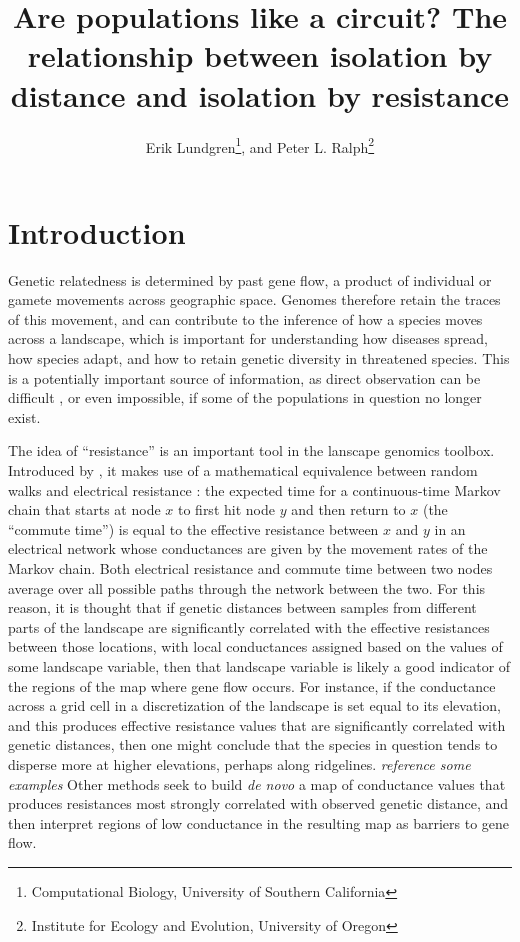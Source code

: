 \documentclass{article}
\newcommand{\plr}[1]{{\em \color{blue} #1}}
\begin{document}
\title{Are populations like a circuit? The relationship between isolation by distance and isolation by resistance}
\author{Erik Lundgren\footnote{Computational Biology, University of Southern California}, and
        Peter L. Ralph\footnote{Institute for Ecology and Evolution, University of Oregon}}
\maketitle

\begin{abstract}
\end{abstract}


\section*{Introduction}

Genetic relatedness is determined by past gene flow,
a product of individual or gamete movements across geographic space.
Genomes therefore retain the traces of this movement,
and can contribute to the inference of how a species moves across a landscape,
which is important for understanding how diseases spread, how species adapt,
and how to retain genetic diversity in threatened species.
This is a potentially important source of information,
as direct observation can be difficult \citep[especially of long-distance movement]{dispersal_estimation},
or even impossible, if some of the populations in question no longer exist.

The idea of ``resistance'' is an important tool in the lanscape genomics toolbox.
Introduced by \citet{mcrae},
it makes use of a mathematical equivalence between random walks and electrical resistance
\citep{resistance}:
the expected time for a continuous-time Markov chain that starts at node $x$
to first hit node $y$ and then return to $x$ (the ``commute time'')
is equal to the effective resistance between $x$ and $y$ in an electrical network
whose conductances are given by the movement rates of the Markov chain.
Both electrical resistance and commute time between two nodes
average over all possible paths through the network between the two.
For this reason, it is thought that if genetic distances between samples
from different parts of the landscape
are significantly correlated with the effective resistances between those locations,
with local conductances assigned based on the values of some landscape variable,
then that landscape variable is likely a good indicator of the regions of the map 
where gene flow occurs.
For instance,
if the conductance across a grid cell in a discretization of the landscape
is set equal to its elevation,
and this produces effective resistance values 
that are significantly correlated with genetic distances,
then one might conclude that the species in question tends to disperse more at higher elevations,
perhaps along ridgelines.
\plr{reference some examples}
Other methods \citep{eems} seek to build \emph{de novo} 
a map of conductance values that produces resistances 
most strongly correlated with observed genetic distance,
and then interpret regions of low conductance in the resulting map as barriers to gene flow.
\end{document}
